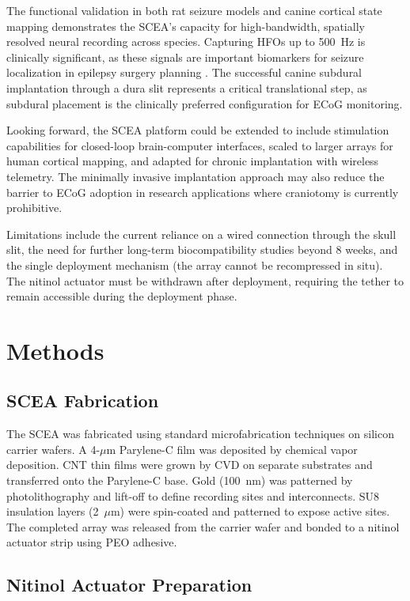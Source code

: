 \documentclass[11pt]{article}
\begin{document}
The functional validation in both rat seizure models and canine cortical state mapping demonstrates the SCEA's capacity for high-bandwidth, spatially resolved neural recording across species. Capturing HFOs up to 500~Hz is clinically significant, as these signals are important biomarkers for seizure localization in epilepsy surgery planning \citep{hfo_epilepsy2016, ecog_seizure2010}. The successful canine subdural implantation through a dura slit represents a critical translational step, as subdural placement is the clinically preferred configuration for ECoG monitoring.

Looking forward, the SCEA platform could be extended to include stimulation capabilities for closed-loop brain-computer interfaces, scaled to larger arrays for human cortical mapping, and adapted for chronic implantation with wireless telemetry. The minimally invasive implantation approach may also reduce the barrier to ECoG adoption in research applications where craniotomy is currently prohibitive.

Limitations include the current reliance on a wired connection through the skull slit, the need for further long-term biocompatibility studies beyond 8 weeks, and the single deployment mechanism (the array cannot be recompressed in situ). The nitinol actuator must be withdrawn after deployment, requiring the tether to remain accessible during the deployment phase.

\section{Methods}

\subsection{SCEA Fabrication}

The SCEA was fabricated using standard microfabrication techniques on silicon carrier wafers. A 4-$\mu$m Parylene-C film was deposited by chemical vapor deposition. CNT thin films were grown by CVD on separate substrates and transferred onto the Parylene-C base. Gold (100~nm) was patterned by photolithography and lift-off to define recording sites and interconnects. SU8 insulation layers (2~$\mu$m) were spin-coated and patterned to expose active sites. The completed array was released from the carrier wafer and bonded to a nitinol actuator strip using PEO adhesive.

\subsection{Nitinol Actuator Preparation}
\end{document}
